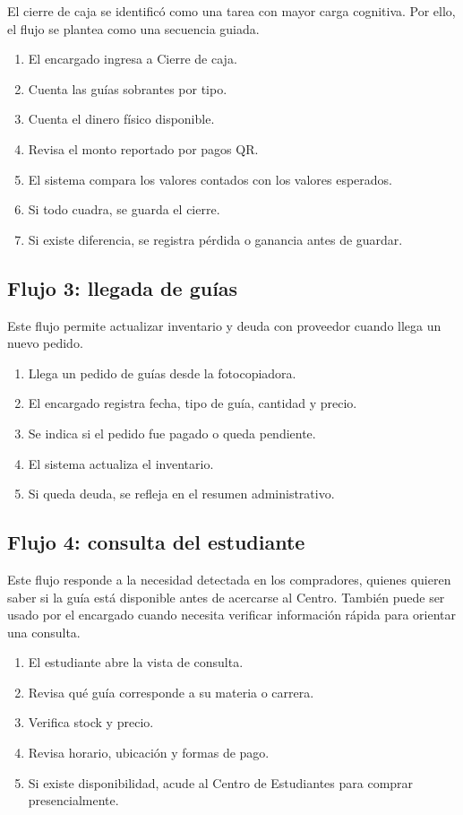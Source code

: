 ﻿\documentclass[12pt,letterpaper]{article}
\begin{document}
El cierre de caja se identificó como una tarea con mayor carga cognitiva. Por ello, el flujo se plantea como una secuencia guiada.

\begin{enumerate}
    \item El encargado ingresa a Cierre de caja.
    \item Cuenta las guías sobrantes por tipo.
    \item Cuenta el dinero físico disponible.
    \item Revisa el monto reportado por pagos QR.
    \item El sistema compara los valores contados con los valores esperados.
    \item Si todo cuadra, se guarda el cierre.
    \item Si existe diferencia, se registra pérdida o ganancia antes de guardar.
\end{enumerate}

\subsection{Flujo 3: llegada de guías}

Este flujo permite actualizar inventario y deuda con proveedor cuando llega un nuevo pedido.

\begin{enumerate}
    \item Llega un pedido de guías desde la fotocopiadora.
    \item El encargado registra fecha, tipo de guía, cantidad y precio.
    \item Se indica si el pedido fue pagado o queda pendiente.
    \item El sistema actualiza el inventario.
    \item Si queda deuda, se refleja en el resumen administrativo.
\end{enumerate}

\subsection{Flujo 4: consulta del estudiante}

Este flujo responde a la necesidad detectada en los compradores, quienes quieren saber si la guía está disponible antes de acercarse al Centro. También puede ser usado por el encargado cuando necesita verificar información rápida para orientar una consulta.

\begin{enumerate}
    \item El estudiante abre la vista de consulta.
    \item Revisa qué guía corresponde a su materia o carrera.
    \item Verifica stock y precio.
    \item Revisa horario, ubicación y formas de pago.
    \item Si existe disponibilidad, acude al Centro de Estudiantes para comprar presencialmente.
\end{enumerate}
\end{document}
